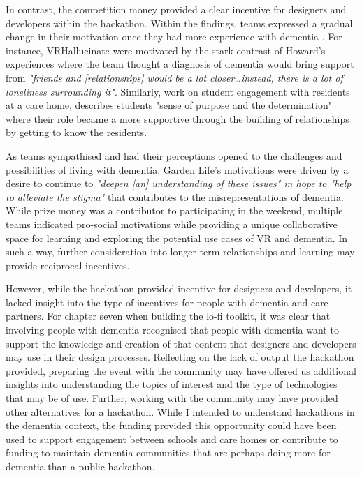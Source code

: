 In contrast, the competition money provided a clear incentive for designers and developers within the hackathon. Within the findings, teams expressed a gradual change in their motivation once they had more experience with dementia \citep{gama2017crowdsourced}. For instance, VRHallucinate were motivated by the stark contrast of Howard's experiences where the team thought a diagnosis of dementia would bring support from \textit{"friends and [relationships] would be a lot closer…instead, there is a lot of loneliness surrounding it"}. Similarly, \citep{foley_student_2020} work on student engagement with residents at a care home, describes students "sense of purpose and the determination" where their role became a more supportive through the building of relationships by getting to know the residents.  

As teams sympathised and had their perceptions opened to the challenges and possibilities of living with dementia, Garden Life's motivations were driven by a desire to continue to \textit{"deepen [an] understanding of these issues" in hope to "help to alleviate the stigma"} that contributes to the misrepresentations of dementia. While prize money was a contributor to participating in the weekend, multiple teams indicated pro-social motivations while providing a unique collaborative space for learning and exploring the potential use cases of VR and dementia. In such a way, further consideration into longer-term relationships and learning may provide reciprocal incentives. 

However, while the hackathon provided incentive for designers and developers, it lacked insight into the type of incentives for people with dementia and care partners. For chapter seven when building the lo-fi toolkit, it was clear that involving people with dementia recognised that people with dementia want to support the knowledge and creation of that content that designers and developers may use in their design processes. Reflecting on the lack of output the hackathon provided, preparing the event with the community may have offered us additional insights into understanding the topics of interest and the type of technologies that may be of use. Further, working with the community may have provided other alternatives for a hackathon. While I intended to understand hackathons in the dementia context, the funding provided this opportunity could have been used to support engagement between schools and care homes or contribute to funding to maintain dementia communities that are perhaps doing more for dementia than a public hackathon.




